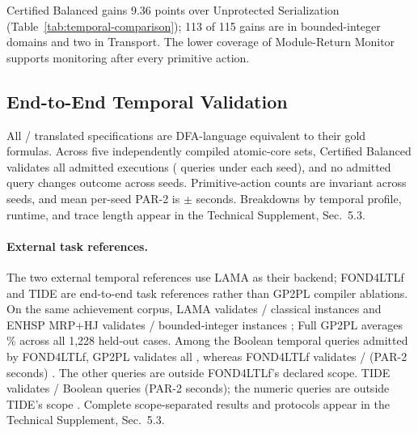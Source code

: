 Certified Balanced gains 9.36 points over Unprotected Serialization
(Table~\ref{tab:temporal-comparison}); 113 of 115 gains are in bounded-integer
domains and two in Transport. The lower coverage of Module-Return Monitor
supports monitoring after every primitive action.

\subsection{End-to-End Temporal Validation}
\label{sec:end-to-end-results}
All \TranslationEquivalentCount{}/\TranslationInputCount{} translated
specifications are DFA-language equivalent to their gold formulas. Across five
independently compiled atomic-core sets, Certified Balanced validates all
\TemporalCrossSeedValidCount{} admitted executions
(\TemporalCrossSeedQueryCount{} queries under each seed), and no admitted query
changes outcome across seeds. Primitive-action counts are invariant across seeds, and mean per-seed
PAR-2 is \TemporalCrossSeedMeanParTwoSeconds{} $\pm$
\TemporalCrossSeedParTwoSDSeconds{} seconds. Breakdowns by temporal profile,
runtime, and trace length appear in the Technical Supplement, Sec.~5.3.

\paragraph{External task references.}
The two external temporal references use LAMA as their backend; FOND4LTLf
and TIDE are end-to-end task references rather than GP2PL compiler ablations.
On the same achievement corpus, LAMA validates
\ExternalLAMAValidCount{}/\ExternalLAMACaseCount{} classical instances and
ENHSP MRP+HJ validates
\ExternalMRPHJValidCount{}/\ExternalMRPHJCaseCount{} bounded-integer instances
\cite{RichterWestphal2010LAMA,Scala2020NumericSubgoaling}; Full GP2PL averages
\AtomicFiveSeedMeanSuccessPercent{}\% across all 1,228 held-out cases. Among the
Boolean temporal queries admitted by FOND4LTLf, GP2PL validates all
\ExternalDirectSupportedCount{}, whereas FOND4LTLf validates
\ExternalDirectValidCount{}/\ExternalDirectSupportedCount{} (PAR-2
\ExternalDirectParTwoSeconds{} seconds) \cite{DeGiacomoFuggitti2021FOND4LTLf}.
The other \ExternalDirectUnsupportedCount{} queries are outside FOND4LTLf's declared
scope. TIDE validates
\ExternalTIDEValidCount{}/\ExternalTIDESupportedCount{} Boolean queries (PAR-2
\ExternalTIDEParTwoSeconds{} seconds); the \ExternalTIDEUnsupportedCount{}
numeric queries are outside TIDE's scope \cite{Suprun2026TIDE}. Complete
scope-separated results and protocols appear in the Technical Supplement,
Sec.~5.3.
